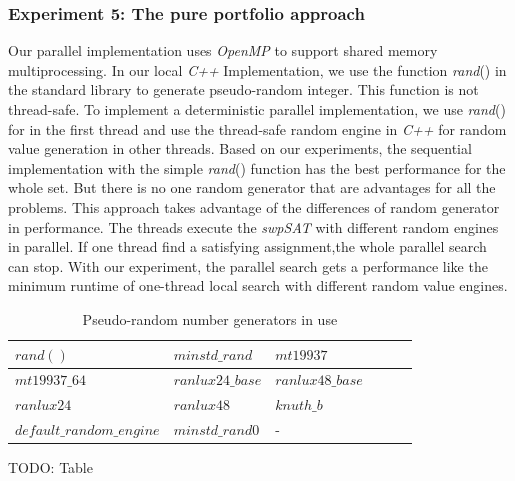 \documentclass[12pt,a4paper,twoside]{scrartcl}
\numberwithin{equation}{section}
\begin{document}
  \subsubsection{Experiment 5: The pure portfolio approach} 
  \label{sec:Experiment 5}
Our parallel implementation uses \emph{OpenMP} to support shared memory multiprocessing. In our local \emph{C++} Implementation, we use the function \emph{rand}() in the standard library to generate pseudo-random integer. This function is not thread-safe. To implement a deterministic parallel implementation, we use \emph{rand}()  for in the first thread and use the thread-safe random engine in \emph{C++} for random value generation in other threads. Based on our experiments, the sequential implementation with the simple \emph{rand}() function has the best performance for the whole set. But there is no one random generator that are advantages for all the problems. This approach takes advantage of the differences of random generator in performance. The threads execute the \emph{swpSAT} with different random engines in parallel. If one thread find a satisfying assignment,the whole parallel search can stop. With our experiment, the parallel search gets a performance like the minimum runtime of one-thread local search with different random value engines. \\
\begin{table}[h!]
\begin{center}
    \begin{tabular}{|l|l|l|l|l|p{1cm}|}
\hline 
$rand()$&$minstd\_rand$&$mt19937$\\ \hline
$mt19937\_64$&$ranlux24\_base$&$ranlux48\_base$\\ \hline
$ranlux24$&$ranlux48$&$knuth\_b$\\ \hline
$default\_random\_engine$&$minstd\_rand0$&-\\ \hline
\end{tabular}
\end{center}
\caption{Pseudo-random number generators in use}
\end{table} 
TODO: Table
\end{document}
